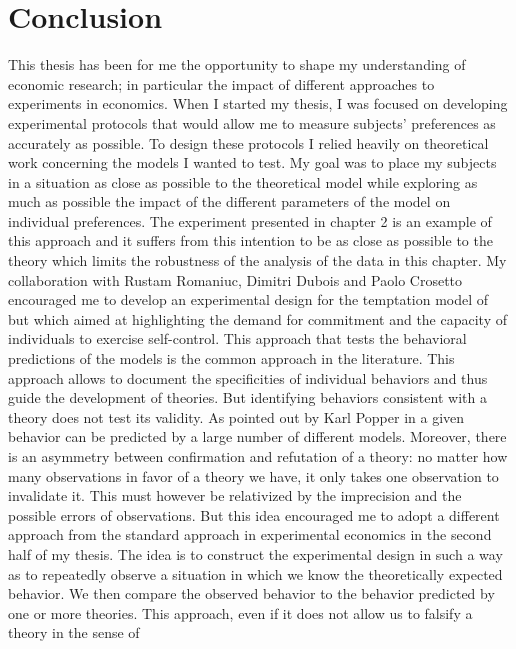 \documentclass[
]{book}
\begin{document}
\hypertarget{conclusion5}{%
\chapter*{Conclusion}\label{conclusion5}}

This thesis has been for me the opportunity to shape my understanding of
economic research;
in particular the impact of different approaches to experiments in economics.
When I started my thesis, I was focused on developing experimental protocols
that would allow me to measure subjects' preferences as accurately as possible.
To design these protocols I relied heavily on theoretical work concerning the
models I wanted to test.
My goal was to place my subjects in a situation as close as possible to the
theoretical model while exploring as much as possible the impact of the
different parameters of the model on individual preferences.
The experiment presented in chapter 2 is an example of this approach and it
suffers from this intention to be as close as possible to the theory which
limits the robustness of the analysis of the data in this chapter.
My collaboration with Rustam Romaniuc, Dimitri Dubois and Paolo Crosetto
encouraged me to develop an experimental design for the temptation model of
\citet{gul2001temptation} but which aimed at highlighting the demand for commitment and
the capacity of individuals to exercise self-control.
This approach that tests the behavioral predictions of the models is the common
approach in the literature.
This approach allows to document the specificities of individual behaviors
and thus guide the development of theories.
But identifying behaviors consistent with a theory does not test its validity.
As pointed out by Karl Popper in \citet{popper2005logic} a given behavior can be
predicted by a large number of different models. Moreover, there is an
asymmetry between confirmation and refutation of a theory: no matter how many
observations in favor of a theory we have, it only takes one
observation to invalidate it.
This must however be relativized by the imprecision and the possible errors of
observations.
But this idea encouraged me to adopt a different approach from the standard
approach in experimental economics in the second half of my thesis.
The idea is to construct the experimental design in such a way as to
repeatedly observe a situation in which we know the theoretically expected
behavior.
We then compare the observed behavior to the behavior predicted by one or more
theories.
This approach, even if it does not allow us to falsify a theory in the sense of
\end{document}
